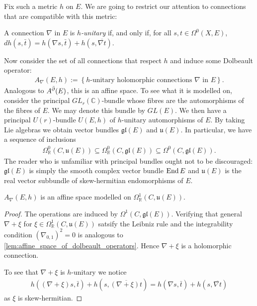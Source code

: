 \documentclass[12pt]{ociamthesis}  %
\begin{document}
Fix such a metric $h$ on $E$. We are going to restrict our attention to
connections that are compatible with this metric:

\begin{definition}
  A connection $\nabla$ in $E$ is \emph{$h$-unitary}
  if, and only if, for all $s,t\in\Omega^0(X,E)$,
  $dh(s,\bar t) = h(\nabla s,\bar t) + h(s,\overline{\nabla t})$.
\end{definition}

Now consider the set of all connections that respect $h$ and induce
some Dolbeault operator:
\begin{align*}
  A_\nabla(E,h) := \left\lbrace{\text{$h$-unitary holomorphic connections $\nabla$ in $E$}}\right\rbrace.
\end{align*}
Analogous to $A^{\bar{\partial}} (E)$, this is an affine space. To see what it is
modelled on, consider the principal $GL_r(\mathbb{C})$-bundle whose fibres 
are the automorphisms of the fibres of $E$. We may denote this bundle by $GL(E)$.
We then have a principal $U(r)$-bundle $U(E,h)$ of $h$-unitary automorphisms
of $E$. By taking Lie algebras we obtain vector bundles $\mathfrak{gl}(E)$
and $\mathfrak u(E)$. In particular, we have a sequence of inclusions
\begin{align*}
  \Omega^0_{\mathbb{R}}(C,\mathfrak u(E))
  \subseteq \Omega^0_{\mathbb{R}}(C,\mathfrak{gl}(E))
  \subseteq \Omega^0(C,\mathfrak{gl}(E)).
\end{align*}
The reader who is unfamiliar with principal bundles
ought not to be discouraged: $\mathfrak{gl}(E)$ is simply the smooth complex
vector bundle $\operatorname{End} E$ and $\mathfrak{u}(E)$ is the real vector subbundle
of skew-hermitian endomorphisms of $E$.

\begin{lemma}
  $A_\nabla(E,h)$ is an affine space modelled on
  $\Omega^1_{\mathbb{R}}(C,\mathfrak u(E))$.
  \begin{proof}
    The operations are induced by $\Omega^1(C,\mathfrak{gl}(E))$.
    Verifying that general $\nabla + \xi$ for
    $\xi\in\Omega^1_{\mathbb{R}}(C,\mathfrak u(E))$
    satsify the Leibniz rule and the integrability
    condition $(\nabla_{0,1})^2=0$ is analogous to
    \ref{lem:affine_space_of_dolbeault_operators}. Hence $\nabla + \xi$
    is a holomorphic connection.

    To see that $\nabla + \xi$ is $h$-unitary we notice
    \begin{align*}
      h((\nabla + \xi)s, \bar t) + h(s,\overline{(\nabla + \xi)t})
      =  h(\nabla s, \bar t) + h(s,\overline{\nabla t})
    \end{align*}
    as $\xi$ is skew-hermitian.
  \end{proof}
\end{lemma}
\end{document}
